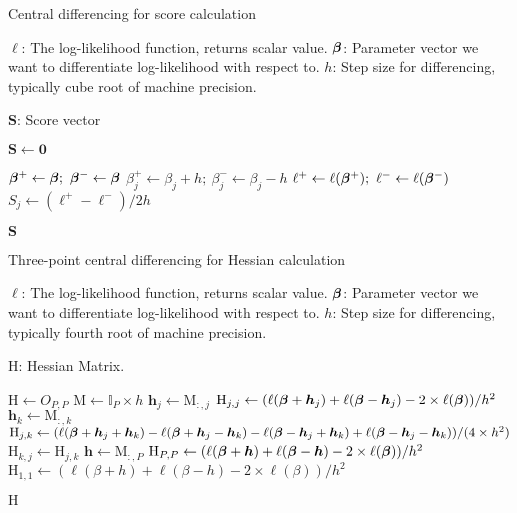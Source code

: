 \begin{algorithm}[H]
  \caption{Central differencing for score calculation}\label{alg:app-cendiff}
  \begin{algorithmic}[1]
    \Require
      \Statex $\ell$: The log-likelihood function, returns scalar value.
      \Statex $\bm{\beta}$: Parameter vector we want to differentiate log-likelihood with respect to.
      \Statex $h$: Step size for differencing, typically cube root of machine precision.

    \Ensure
      \Statex $\bm{S}$: Score vector

    \State $\bm{S} \gets \bm{0}$ 

     
      \State $\bm{\beta}^+ \gets \bm{\beta};\ \bm{\beta}^- \gets \bm{\beta}$ 
      \State $\beta^+_j \gets \beta_j + h;\ \beta^-_j \gets \beta_j - h$ 
      \State $\ell^+ \gets \ell(\bm{\beta}^+);\ \ell^- \gets \ell(\bm{\beta}^-)$ 
      \State $S_j \gets (\ell^+ - \ell^-) / 2h$
    \EndFor

    \State \Return $\bm{S}$ 
  \end{algorithmic}
\end{algorithm}
\clearpage
\begin{algorithm}
    \caption{Three-point central differencing for Hessian calculation}\label{alg:app-cenhess}
    \begin{algorithmic}[1]
        \Require
            \Statex $\ell$: The log-likelihood function, returns scalar value.
            \Statex $\bm{\beta}$: Parameter vector we want to differentiate log-likelihood with respect to.
            \Statex $h$: Step size for differencing, typically fourth root of machine precision.

        \Ensure 
            \Statex $\mathrm{H}$: Hessian Matrix.

        \State $\mathrm{H} \gets O_{P,P}$ 
        \State $\mathrm{M} \gets \mathbb{I}_P\times h$  
                \State $\bm{h}_j \gets \mathrm{M}_{:,j}$
                \State $\mathrm{H}_{j,j} \gets (\ell(\bm{\beta}+\bm{h}_j) + \ell(\bm{\beta} - \bm{h}_j) - 2\times\ell(\bm{\beta}))/h^2$ 
                    \State $\bm{h}_k \gets \mathrm{M}_{:,k}$
                    \State $\mathrm{H}_{j,k} \gets (\ell(\bm{\beta}+\bm{h}_j+\bm{h}_k) - \ell(\bm{\beta}+\bm{h}_j-\bm{h}_k) - \ell(\bm{\beta}-\bm{h}_j+\bm{h}_k) + \ell(\bm{\beta}-\bm{h}_j-\bm{h}_k))/(4\times h^2)$
                    \State $\mathrm{H}_{k,j} \gets \mathrm{H}_{j,k}$ 
                \EndFor
            \EndFor
            \State $\bm{h} \gets \mathrm{M}_{:,P}$
            \State $\mathrm{H}_{P,P} \gets (\ell(\bm{\beta}+\bm{h}) + \ell(\bm{\beta} - \bm{h}) - 2\times\ell(\bm{\beta}))/h^2$ 
        \Else
            \State $\mathrm{H}_{1,1} \gets (\ell(\beta+h) + \ell(\beta - h) - 2\times\ell(\beta))/h^2$ 
        \EndIf

        \State \Return $\mathrm{H}$
    \end{algorithmic}
\end{algorithm}

